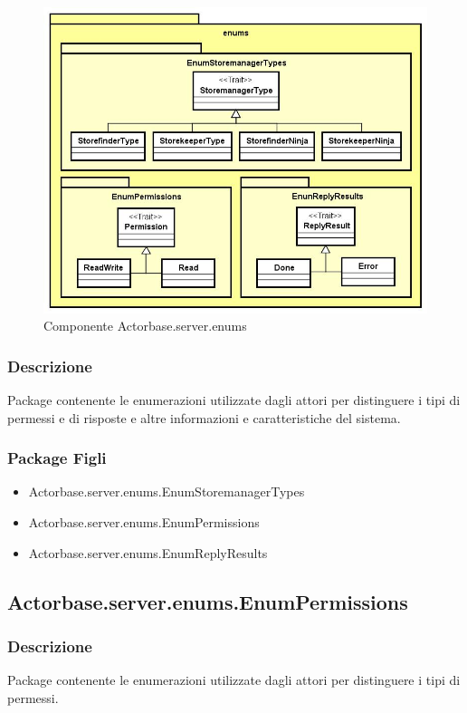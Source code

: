 \documentclass[a4paper]{article}
\begin{document}
			\begin{figure} [H]
				\centering
				\includegraphics[width=\textwidth]{ST/Server/enumsLevel.jpg}
				\caption{Componente Actorbase.server.enums}
			\end{figure}
			
			\subsubsection{Descrizione}
				Package contenente le enumerazioni utilizzate dagli attori per distinguere i tipi di permessi e di risposte e altre informazioni e caratteristiche del sistema.
				
			\subsubsection{Package Figli}
				\begin{itemize}
					\item Actorbase.server.enums.EnumStoremanagerTypes
					\item Actorbase.server.enums.EnumPermissions
					\item Actorbase.server.enums.EnumReplyResults
				\end{itemize}
				
				
		\subsection{Actorbase.server.enums.EnumPermissions}
			\subsubsection{Descrizione}
				Package contenente le enumerazioni utilizzate dagli attori per distinguere i tipi di permessi.
				
\end{document}
